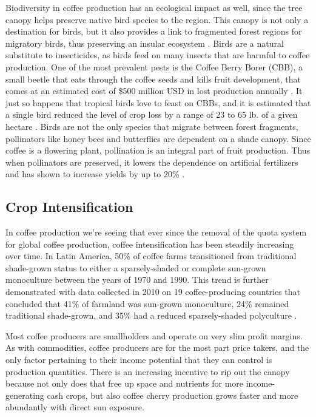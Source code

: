 \documentclass[../main.tex]{subfiles}
\begin{document}
Biodiversity in coffee production has an ecological impact as well, since the tree canopy helps preserve native bird species to the region. This canopy is not only a destination for birds, but it also provides a link to fragmented forest regions for migratory birds, thus preserving an insular ecosystem \parencite{greenberg_bird_1997}. Birds are a natural substitute to insecticides, as birds feed on many insects that are harmful to coffee production. One of the most prevalent pests is the Coffee Berry Borer (CBB), a small beetle that eats through the coffee seeds and kills fruit development, that comes at an estimated cost of \$500 million USD in lost production annually \parencite{jaramillo_like_2011}. It just so happens that tropical birds love to feast on CBBs, and it is estimated that a single bird reduced the level of crop loss by a range of 23 to 65 lb. of a given hectare \parencite{hernandez-aguilera_economics_2019}. Birds are not the only species that migrate between forest fragments, pollinators like honey bees and butterflies are dependent on a shade canopy. Since coffee is a flowering plant, pollination is an integral part of fruit production. Thus when pollinators are preserved, it lowers the dependence on artificial fertilizers and has shown to increase yields by up to 20\% \parencite{jha_shade_2014}.

\subsection{Crop Intensification}

In coffee production we’re seeing that ever since the removal of the quota system for global coffee production, coffee intensification has been steadily increasing over time. In Latin America, 50\% of coffee farms transitioned from traditional shade-grown status to either a sparsely-shaded or complete sun-grown monoculture between the years of 1970 and 1990. This trend is further demonstrated with data collected in 2010 on 19 coffee-producing countries that concluded that 41\% of farmland was sun-grown monoculture, 24\% remained traditional shade-grown, and 35\% had a reduced sparsely-shaded polyculture \parencite{jha_shade_2014}. 

Most coffee producers are smallholders and operate on very slim profit margins. As with commodities, coffee producers are for the most part price takers, and the only factor pertaining to their income potential that they can control is production quantities. There is an increasing incentive to rip out the canopy because not only does that free up space and nutrients for more income-generating cash crops, but also coffee cherry production grows faster and more abundantly with direct sun exposure. 
\end{document}
